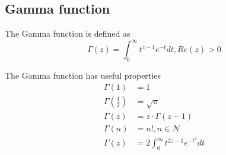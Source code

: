 \subsection{Gamma function}
The Gamma function is defined as
\begin{equation}
    \label{Equation: Gamma function}
    \Gamma(z) = \int_0^\infty t^{z-1} e^{-t} dt, Re(z) > 0
\end{equation}

The Gamma function has useful properties
\begin{align*}
    \Gamma(1)           & = 1                                    \\
    \Gamma(\frac{1}{2}) & = \sqrt{\pi}                           \\
    \Gamma(z)           & = z \cdot \Gamma(z-1)                  \\
    \Gamma(n)           & = n!, n \in \mathcal{N}                \\
    \Gamma(z)           & = 2 \int_0^\infty t^{2z-1} e^{-t^2} dt
\end{align*}

